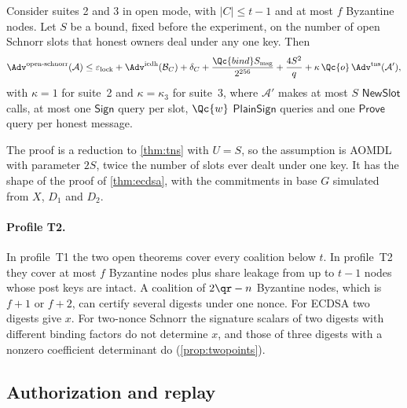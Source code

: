 \begin{theorem}\label{thm:schnorr}
Consider suites 2 and 3 in open mode, with $|C| \le t-1$ and at most $f$ Byzantine nodes. Let $S$ be a bound, fixed before the experiment, on the number of open Schnorr slots that honest owners deal under any one key. Then
\[
  \Adv^{\mathrm{open\text{-}schnorr}}(\mathcal{A}) \le \varepsilon_{\mathrm{lock}} + \Adv^{\mathrm{icdh}}(\mathcal{B}_C) + \delta_C + \frac{\Qc{bind} S_{\mathrm{msg}}}{2^{256}} + \frac{4S^2}{q} + \kappa\,\Qc{o}\,\Adv^{\mathrm{tns}}(\mathcal{A}'),
\]
with $\kappa = 1$ for suite~2 and $\kappa = \kappa_3$ for suite~3, where $\mathcal{A}'$ makes at most $S$ $\mathsf{NewSlot}$ calls, at most one $\mathsf{Sign}$ query per slot, $\Qc{w}$ $\mathsf{PlainSign}$ queries and one $\mathsf{Prove}$ query per honest message.
\end{theorem}

The proof is a reduction to \cref{thm:tns} with $U = S$, so the assumption is AOMDL with parameter $2S$, twice the number of slots ever dealt under one key. It has the shape of the proof of \cref{thm:ecdsa}, with the commitments in base $G$ simulated from $X$, $D_1$ and $D_2$.

\paragraph{Profile T2.} In profile~T1 the two open theorems cover every coalition below $t$. In profile~T2 they cover at most $f$ Byzantine nodes plus share leakage from up to $t-1$ nodes whose post keys are intact. A coalition of $2\qr - n$ Byzantine nodes, which is $f+1$ or $f+2$, can certify several digests under one nonce. For ECDSA two digests give $x$. For two-nonce Schnorr the signature scalars of two digests with different binding factors do not determine $x$, and those of three digests with a nonzero coefficient determinant do (\cref{prop:twopoints}).

\subsection{Authorization and replay}

